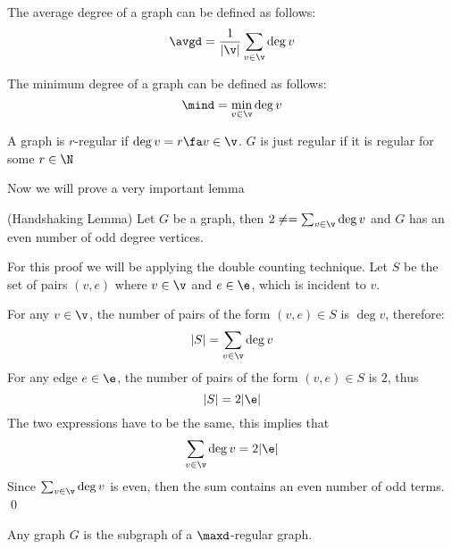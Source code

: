 \begin{definition}
    The average degree of a graph can be defined as follows:
    \begin{equation*}
        \avgd = \frac{1}{|\v|}\sum_{v \in \v}\deg{v}
    \end{equation*}
\end{definition}
\begin{definition}
    The minimum degree of a graph can be defined as follows:
    \begin{equation*}
        \mind = \min_{v \in \v}\deg{v}
    \end{equation*}
\end{definition}
\begin{definition}
    A graph is $r$-regular if $\deg{v} = r \fa v \in \v$. $G$ is just regular if it is regular for some $r \in \N$
\end{definition}
Now we will prove a very important lemma
\begin{customlemma}{(Handshaking Lemma)}
    \label{lemma:handshaking}
    Let $G$ be a graph, then $2\ne = \sum_{v \in \v}\deg{v}$ and $G$ has an even number of odd degree vertices.
\end{customlemma}
\begin{prf}
    For this proof we will be applying the double counting technique. Let $S$ be the set of pairs $(v, e)$ where $v \in \v$ and $e \in \e$, which is incident to $v$.

    For any $v \in \v$, the number of pairs of the form $(v, e) \in S$ is $\deg{v}$, therefore:
    \begin{equation*}
        |S| = \sum_{v \in \v}\deg{v}
    \end{equation*}
    For any edge $e \in \e$, the number of pairs of the form $(v, e) \in S$ is $2$, thus
    \begin{equation*}
        |S| = 2|\e|
    \end{equation*}
    The two expressions have to be the same, this implies that
    \begin{equation*}
        \sum_{v \in \v}\deg{v} = 2|\e|
    \end{equation*}
    Since $\sum_{v \in \v}\deg{v}$ is even, then the sum contains an even number of odd terms. \qed
\end{prf}
\begin{customproposition}{1.4}
    \label{proposition:1.4}
    Any graph $G$ is the subgraph of a $\maxd$-regular graph.
\end{customproposition}
